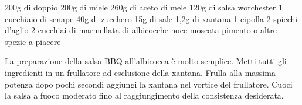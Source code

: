 \label{salsa-bbq}
\serves{-}
\begin{ingreds}
	200g di doppio 
	200g di miele
	260g di aceto di mele
	120g di salsa worchester
	1 cucchiaio di senape
	40g di zucchero
	15g di sale
	1,2g di xantana
	1 cipolla
	2 spicchi d'aglio
	2 cucchiai di marmellata di albicocche
	noce moscata
	pimento o altre spezie a piacere

\end{ingreds}

\begin{method}
La preparazione della salsa BBQ all'albicocca è molto semplice. Metti tutti gli ingredienti in un frullatore ad esclusione della xantana. Frulla alla massima potenza dopo pochi secondi aggiungi la xantana nel vortice del frullatore.
Cuoci la salsa a fuoco moderato fino al raggiungimento della consistenza desiderata.
\end{method}



